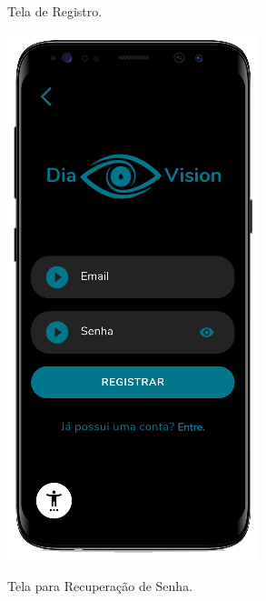 \begin{figure}[htb]
    \centering
    \begin{minipage}{0.44\textwidth}
        \centering
        \caption{Tela de Registro.}\label{fig_app_register}
        \includegraphics[scale=0.72]{Imagens/desenvolvimento/app/app_register.png}
    \end{minipage}
    \hfill
    \begin{minipage}{0.47\textwidth}
        \centering
        \caption{Tela para Recuperação de Senha.}\label{fig_app_rec_pass}

\end{minipage}
\end{figure}
